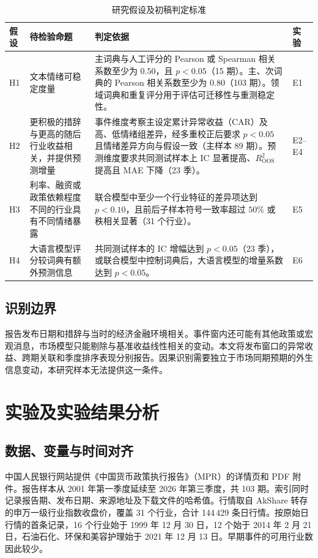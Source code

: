 \begin{table}[htbp]
  \centering\small
  \caption{研究假设及初稿判定标准}
  \label{tab:hypothesis-rules}
  \begin{tabularx}{\linewidth}{@{}l p{.22\linewidth} X l@{}}
    \toprule
    假设 & 待检验命题 & 判定依据 & 实验 \\
    \midrule
    H1 & 文本情绪可稳定度量 & 主词典与人工评分的 Pearson 或 Spearman 相关系数至少为 $0.50$，且 $p<0.05$（15 期）。主、次词典的 Pearson 相关系数至少为 $0.80$（103 期）。领域词典和重复评分用于评估可迁移性与重测稳定性。 & E1 \\
    H2 & 更积极的措辞与更高的随后行业收益相关，并提供预测增量 & 事件维度考察主设定累计异常收益（CAR）及高、低情绪组差异，经多重校正后要求 $p<0.05$ 且情绪差异方向与假设一致（主样本 89 期）。预测维度要求共同测试样本上 IC 显著提高、$R^2_{\mathrm{OOS}}$ 提高且 MAE 下降（23 季）。 & E2--E4 \\
    H3 & 利率、融资或政策依赖程度不同的行业具有不同情绪暴露 & 联合模型中至少一个行业特征的差异项达到 $p<0.10$，且前后子样本符号一致率超过 $50\%$ 或秩相关显著（31 个行业）。 & E5 \\
    H4 & 大语言模型评分较词典有额外预测信息 & 共同测试样本的 IC 增幅达到 $p<0.05$（23 季），或联合模型中控制词典后，大语言模型的增量系数达到 $p<0.05$。 & E6 \\
    \bottomrule
  \end{tabularx}
\end{table}

\subsection{识别边界}

报告发布日期和措辞与当时的经济金融环境相关。事件窗内还可能有其他政策或宏观消息，市场模型只能剔除与基准收益线性相关的变动。本文将发布窗口的异常收益、跨期关联和季度排序表现分别报告。因果识别需要独立于市场同期预期的外生信息变动，本研究样本无法提供这一条件。

\section{实验及实验结果分析}
\label{sec:data}

\subsection{数据、变量与时间对齐}

中国人民银行网站提供《中国货币政策执行报告》（MPR）的详情页和 PDF 附件\cite{pbocMpr}。报告样本从 2001 年第一季度延续至 2026 年第三季度，共 103 期。索引同时记录报告期、发布日期、来源地址及下载文件的哈希值。行情取自 AkShare 转存的申万一级行业指数收盘价，覆盖 31 个行业，合计 144\,429 条日行情。按原始日行情的首条记录，16 个行业始于 1999 年 12 月 30 日，12 个始于 2014 年 2 月 21 日，石油石化、环保和美容护理始于 2021 年 12 月 13 日。早期事件的可用行业数因此较少。

